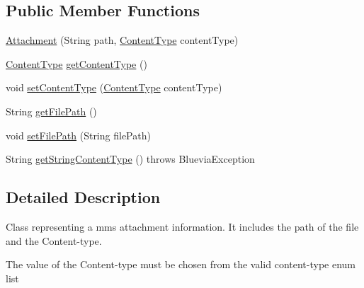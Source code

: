 \subsection*{Public Member Functions}
\begin{DoxyCompactItemize}
\item 
\hyperlink{classcom_1_1bluevia_1_1messagery_1_1mt_1_1mms_1_1data_1_1Attachment_af77fb3163037a88d822aa04b0419e10d}{Attachment} (String path, \hyperlink{classcom_1_1bluevia_1_1messagery_1_1mt_1_1mms_1_1data_1_1Attachment_a8f358da00c8e4c63375fdd64eb698ff2}{ContentType} contentType)
\item 
\hyperlink{classcom_1_1bluevia_1_1messagery_1_1mt_1_1mms_1_1data_1_1Attachment_a8f358da00c8e4c63375fdd64eb698ff2}{ContentType} \hyperlink{classcom_1_1bluevia_1_1messagery_1_1mt_1_1mms_1_1data_1_1Attachment_a788ce692234713666613382ff1258ac1}{getContentType} ()
\item 
void \hyperlink{classcom_1_1bluevia_1_1messagery_1_1mt_1_1mms_1_1data_1_1Attachment_a1044014f13473ec55789195dfe2bee0e}{setContentType} (\hyperlink{classcom_1_1bluevia_1_1messagery_1_1mt_1_1mms_1_1data_1_1Attachment_a8f358da00c8e4c63375fdd64eb698ff2}{ContentType} contentType)
\item 
String \hyperlink{classcom_1_1bluevia_1_1messagery_1_1mt_1_1mms_1_1data_1_1Attachment_af810beabe8eb20d54fb32e8ff2332b42}{getFilePath} ()
\item 
void \hyperlink{classcom_1_1bluevia_1_1messagery_1_1mt_1_1mms_1_1data_1_1Attachment_a43f80f40e8bb851243964d386cc371e9}{setFilePath} (String filePath)
\item 
String \hyperlink{classcom_1_1bluevia_1_1messagery_1_1mt_1_1mms_1_1data_1_1Attachment_a89222bc26b62502253791e24382776c1}{getStringContentType} ()  throws BlueviaException
\end{DoxyCompactItemize}


\subsection{Detailed Description}
Class representing a mms attachment information. It includes the path of the file and the Content-\/type.

The value of the Content-\/type must be chosen from the valid content-\/type enum list 

